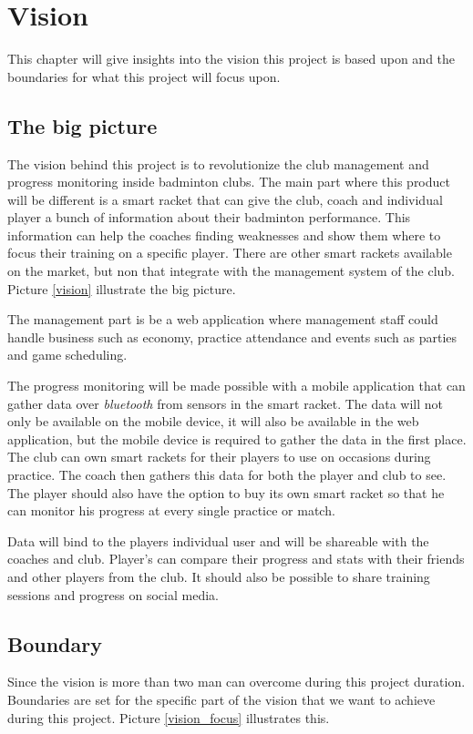 \chapter{Vision}
This chapter will give insights into the vision this project is based upon and the boundaries for what this project will focus upon.


\section*{The big picture}

The vision behind this project is to revolutionize the club management and progress monitoring inside badminton clubs. The main part where this product will be different is a smart racket that can give the club, coach and individual player a bunch of information about their badminton performance. This information can help the coaches finding weaknesses and show them where to focus their training on a specific player. There are other smart rackets available on the market, but non that integrate with the management system of the club. Picture \ref{vision} illustrate the big picture.

The management part is be a web application where management staff could handle business such as economy, practice attendance and events such as parties and game scheduling.

The progress monitoring will be made possible with a mobile application that can gather data over \textit{bluetooth} from sensors in the smart racket. The data will not only be available on the mobile device, it will also be available in the web application, but the mobile device is required to gather the data in the first place. The club can own smart rackets for their players to use on occasions during practice. The coach then gathers this data for both the player and club to see. The player should also have the option to buy its own smart racket so that he can monitor his progress at every single practice or match.

Data will bind to the players individual user and will be shareable with the coaches and club. Player's can compare their progress and stats with their friends and other players from the club. It should also be possible to share training sessions and progress on social media.


\section*{Boundary}
Since the vision is more than two man can overcome during this project duration. Boundaries are set for the specific part of the vision that we want to achieve during this project. Picture \ref{vision_focus} illustrates this.

